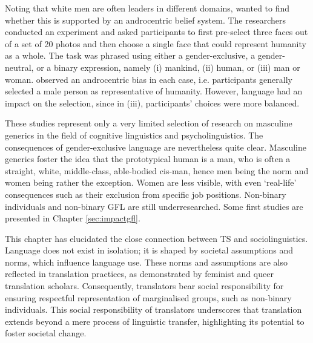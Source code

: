 Noting that white men are often leaders in different domains, \textcite{bailey2017counts} wanted to find whether this is supported by an androcentric belief system. The researchers conducted an experiment and asked participants to first pre-select three faces out of a set of 20 photos and then choose a single face that could represent humanity as a whole. The task was phrased using either a gender-exclusive, a gender-neutral, or a binary expression, namely (i) mankind, (ii) human, or (iii) man or woman. \citeauthor{bailey2017counts} observed an androcentric bias in each case, i.e. participants generally selected a male person as representative of humanity. However, language had an impact on the selection, since in (iii), participants' choices were more balanced.

These studies represent only a very limited selection of research on masculine generics in the field of cognitive linguistics and psycholinguistics. The consequences of gender-exclusive language are nevertheless quite clear. Masculine generics foster the idea that the prototypical human is a man, who is often a straight, white, middle-class, able-bodied cis-man, hence men being the norm and women being rather the exception. Women are less visible, with even `real-life' consequences such as their exclusion from specific job positions. Non-binary individuals and non-binary GFL are still underresearched. Some first studies are presented in Chapter \ref{sec:impactgfl}.

This chapter has elucidated the close connection between TS and sociolinguistics. Language does not exist in isolation; it is shaped by societal assumptions and norms, which influence language use. These norms and assumptions are also reflected in translation practices, as demonstrated by feminist and queer translation scholars. Consequently, translators bear social responsibility for ensuring respectful representation of marginalised groups, such as non-binary individuals. This social responsibility of translators underscores that translation extends beyond a mere process of linguistic transfer, highlighting its potential to foster societal change.
